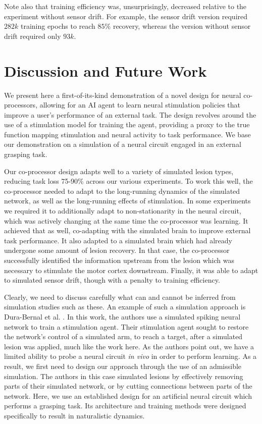 \documentclass[12pt]{iopart}
\begin{document}
Note also that training efficiency was, unsurprisingly, decreased relative to
the experiment without sensor drift. For example, the sensor drift version
required $282k$ training epochs to reach $85\%$ recovery, whereas the version
without sensor drift required only $93k$.

\section{Discussion and Future Work}
\label{sec:discussion}

We present here a first-of-its-kind demonstration of a novel design for neural co-processors,
allowing for an AI agent to learn neural stimulation policies that improve a user's performance
of an external task. The design revolves around the use of a stimulation model for training the
agent, providing a proxy to the true function mapping stimulation and neural activity
to task performance. We base our demonstration on a simulation of a neural circuit engaged in
an external grasping task.

Our co-processor design adapts well to a variety of simulated lesion types, reducing task loss
75-90\% across our various experiments. To work this well, the co-processor needed to adapt to
the long-running dynamics of the simulated network, as well as the long-running effects of
stimulation. In some experiments we required it to additionally adapt to non-stationarity in
the neural circuit, which was actively changing at the same time the co-processor was learning.
It achieved that as well, co-adapting with the simulated brain to improve external task
performance. It also adapted to a simulated brain which had already undergone some amount of
lesion recovery. In that case, the co-processor successfully identified the information upstream
from the lesion which was necessary to stimulate the motor cortex downstream. Finally, it was
able to adapt to simulated sensor drift, though with a penalty to training efficiency.

Clearly, we need to discuss carefully what can and cannot be inferred from simulation studies
such as these. An example of such a simulation approach is Dura-Bernal et al.
\cite{bernal.sim}. In this work, the authors use a simulated spiking neural network to train
a stimulation agent. Their stimulation agent sought to restore the network's
control of a simulated arm, to reach a target, after a simulated lesion was applied,
much like the work here. As the authors point out, we have a limited ability to
probe a neural circuit \textit{in vivo} in order to perform learning. As a result,
we first need to design our approach through the use of an admissible simulation.
The authors in this case simulated lesions by effectively removing parts of their
simulated network, or by cutting connections between parts of the network.
Here, we use an established design for an artificial neural circuit which
performs a grasping task. Its architecture and training methods were designed
specifically to result in naturalistic dynamics.
\end{document}
